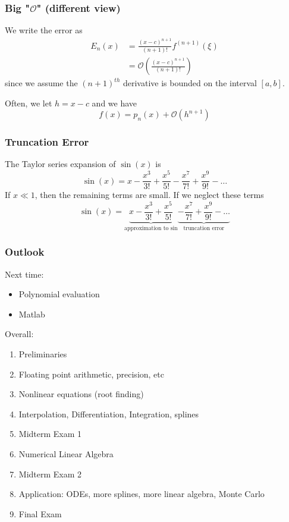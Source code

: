 \documentclass[10pt]{beamer}
\newcommand{\mO}{{\mathcal{O}}}
\begin{document}
\begin{frame}
\frametitle{Big "$\mO$" (different view)}
We write the error as 
\begin{align*}
  E_n(x) &= \frac{(x-c)^{n+1}}{(n+1)!}f^{(n+1)}(\xi)\\
  & = \mO\left(\frac{(x-c)^{n+1}}{(n+1)!}\right)
\end{align*}
since we assume the $(n+1)^{th}$ derivative is bounded on the interval
$[a,b]$.

\vspace{0.5cm}
Often, we let $h=x-c$ and we have
\begin{equation*}
  f(x) = p_n(x) + \mO(h^{n+1})
\end{equation*}

\end{frame}
\begin{frame}
\frametitle{Truncation Error}
The Taylor series expansion of $\sin{(x)}$ is 
\begin{equation*}
  \sin{(x)} = x 
  -\frac{x^3}{3!}
  +\frac{x^5}{5!}
  -\frac{x^7}{7!}
  +\frac{x^9}{9!} -\dots
\end{equation*}
If $x \ll 1$, then the remaining terms are small.  If we neglect these terms
\begin{equation*}
  \sin{(x)} = \underbrace{x 
  -\frac{x^3}{3!}
  +\frac{x^5}{5!}}_{\text{approximation to sin}}
  \underbrace{-\frac{x^7}{7!}
  +\frac{x^9}{9!} -\dots}_{\text{truncation error}}
\end{equation*}
\end{frame}
\begin{frame}
\frametitle{Outlook}
Next time:
\begin{itemize}
  \item Polynomial evaluation
  \item Matlab
\end{itemize}
\bigskip
Overall:
\begin{enumerate}
  \item Preliminaries
  \item Floating point arithmetic, precision, etc
  \item Nonlinear equations (root finding)
  \item Interpolation, Differentiation, Integration, splines
  \item Midterm Exam 1

  \item Numerical Linear Algebra
  \item Midterm Exam 2

  \item Application: ODEs, more splines, more linear algebra, Monte Carlo
  \item Final Exam
\end{enumerate}
\end{frame}
\end{document}
